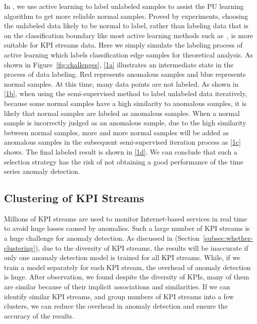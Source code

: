In \name{}, we use active learning to label unlabeled samples to assist the PU learning algorithm to get more reliable normal samples. Proved by experiments, choosing the unlabeled data likely to be normal to label, rather than labeling data that is on the classification boundary like most active learning methods such as~\cite{activelearning2015}, is more suitable for KPI streams data. Here we simply simulate the labeling process of active learning which labels classification edge samples for theoretical analysis. As shown in Figure~\ref{fig:challenges}, \autoref{1a} illustrates an intermediate state in the process of data labeling. Red represents anomalous samples and blue represents normal samples. At this time, many data points are not labeled. As shown in \autoref{1b}, when using the semi-supervised method to label unlabeled data iteratively, because some normal samples have a high similarity to anomalous samples, it is likely that normal samples are labeled as anomalous samples. When a normal sample is incorrectly judged as an anomalous sample, due to the high similarity between normal samples, more and more normal samples will be added as anomalous samples in the subsequent semi-supervised iteration process as \autoref{1c} shows. The final labeled result is shown in \autoref{1d}. We can conclude that such a selection strategy has the risk of not obtaining 
a good performance of the time series anomaly detection.

\subsection{Clustering of KPI Streams}
\label{subsec:clustering}
Millions of KPI streams are used to monitor Internet-based services in real time to avoid huge losses caused by anomalies. Such a large number of KPI streams is a huge challenge for anomaly detection. As discussed in (Section~\ref{subsec:whether-clustering}), due to the diversity of KPI streams, the results will be inaccurate if only one anomaly detection model is trained for all KPI streams. While, if we train a model separately for each KPI stream, the overhead of anomaly detection is huge. After observation, we found despite the diversity of KPIs, many of them are similar because of their implicit associations and similarities. If we can identify similar KPI streams, and group numbers of KPI streams into a few clusters, we can reduce the overhead in anomaly detection and ensure the accuracy of the results.

